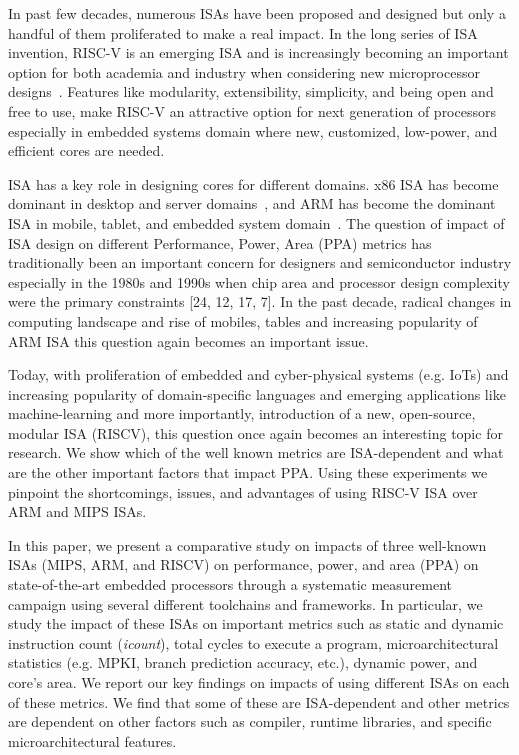 \label{sec:intro}

In past few decades, numerous ISAs have been proposed and designed but only a handful of them proliferated to make a real impact. In the long series of ISA invention, RISC-V is an emerging ISA and is increasingly becoming an important option for both academia and industry when considering new microprocessor designs~\cite{risc-v}. Features like modularity, extensibility, simplicity, and being open and free to use, make RISC-V an attractive option for next generation of processors especially in embedded systems domain where new, customized, low-power, and efficient cores are needed.  

ISA has a key role in designing cores for different domains. x86 ISA has become dominant in desktop and server domains~\cite{x86-isa}, and ARM has become the dominant ISA in mobile, tablet, and embedded system domain~\cite{arm-isa}. The question of impact of ISA design on different Performance, Power, Area (PPA) metrics has traditionally been an important concern for designers and semiconductor industry especially in the 1980s and 1990s when chip area and processor design complexity were the primary
constraints [24, 12, 17, 7]. In the past decade, radical changes in computing landscape and rise of mobiles, tables and increasing popularity of ARM ISA this question again becomes an important issue. 

Today, with proliferation of embedded and cyber-physical systems (e.g. IoTs) and increasing popularity of domain-specific languages and emerging applications like machine-learning and more importantly, introduction of a new, open-source, modular ISA (RISCV), this question once again becomes an interesting topic for research. We show which of the well known metrics are ISA-dependent and what are the other important factors that impact PPA. Using these experiments we pinpoint the shortcomings, issues, and advantages of using RISC-V ISA over ARM and MIPS ISAs.  
 

In this paper, we present a comparative study on impacts of three well-known ISAs (MIPS, ARM, and RISCV) on performance, power, and area (PPA) on state-of-the-art embedded processors through a systematic measurement campaign using several different toolchains and frameworks. In particular, we study the impact of these ISAs on important metrics such as static and dynamic instruction count (\textit{icount}), total cycles to execute a program, microarchitectural statistics (e.g. MPKI, branch prediction accuracy, etc.), dynamic power, and core's area. We report our key findings on impacts of using different ISAs on each of these metrics. We find that some of these are ISA-dependent and other metrics are dependent on other factors such as compiler, runtime libraries, and specific microarchitectural features. 

